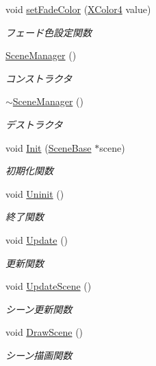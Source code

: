 \begin{DoxyCompactItemize}
void \mbox{\hyperlink{class_scene_manager_a24e7fa08c34ecacdca37ee35c5c39141}{set\+Fade\+Color}} (\mbox{\hyperlink{_vector3_d_8h_a680c30c4a07d86fe763c7e01169cd6cc}{X\+Color4}} value)
\begin{DoxyCompactList}\small\item\em フェード色設定関数 \end{DoxyCompactList}\item 
\mbox{\hyperlink{class_scene_manager_a52085e6737c23b491c228e86781af808}{Scene\+Manager}} ()
\begin{DoxyCompactList}\small\item\em コンストラクタ \end{DoxyCompactList}\item 
\mbox{\hyperlink{class_scene_manager_a2bb376a85d29e85f47753e26c7539229}{$\sim$\+Scene\+Manager}} ()
\begin{DoxyCompactList}\small\item\em デストラクタ \end{DoxyCompactList}\item 
void \mbox{\hyperlink{class_scene_manager_a3d14c04a921c6c670e89fbf22a719b00}{Init}} (\mbox{\hyperlink{class_scene_base}{Scene\+Base}} $\ast$scene)
\begin{DoxyCompactList}\small\item\em 初期化関数 \end{DoxyCompactList}\item 
void \mbox{\hyperlink{class_scene_manager_ae3ff21f2261fc50f1e860cf7fc3a2108}{Uninit}} ()
\begin{DoxyCompactList}\small\item\em 終了関数 \end{DoxyCompactList}\item 
void \mbox{\hyperlink{class_scene_manager_a63dcf65832d6a2c190bf496d9a3b00a3}{Update}} ()
\begin{DoxyCompactList}\small\item\em 更新関数 \end{DoxyCompactList}\item 
void \mbox{\hyperlink{class_scene_manager_a493bc0d65558ce004f6f248a185ba956}{Update\+Scene}} ()
\begin{DoxyCompactList}\small\item\em シーン更新関数 \end{DoxyCompactList}\item 
void \mbox{\hyperlink{class_scene_manager_a828b35826f757b8af34aa767c6b40378}{Draw\+Scene}} ()
\begin{DoxyCompactList}\small\item\em シーン描画関数 \end{DoxyCompactList}\end{DoxyCompactItemize}

